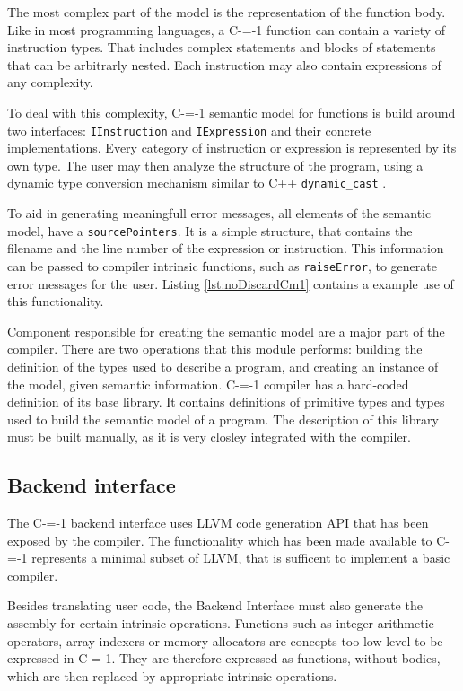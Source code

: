 The most complex part of the model is the representation of the function body.
Like in most programming languages, a C-=-1 function can contain a variety of instruction types.
That includes complex statements and blocks of statements that can be arbitrarly nested.
Each instruction may also contain expressions of any complexity.

To deal with this complexity, C-=-1 semantic model for functions is build around two interfaces: \lstinline{IInstruction} and \lstinline{IExpression} and their concrete implementations.
Every category of instruction or expression is represented by its own type.
The user may then analyze the structure of the program, using a dynamic type conversion mechanism similar to C++ \lstinline{dynamic_cast} \cite{ISO:cpp98}.

To aid in generating meaningfull error messages, all elements of the semantic model, have a \lstinline{sourcePointers}.
It is a simple structure, that contains the filename and the line number of the expression or instruction.
This information can be passed to compiler intrinsic functions, such as \lstinline{raiseError}, to generate error messages for the user.
Listing \ref{lst:noDiscardCm1} contains a example use of this functionality.

Component responsible for creating the semantic model are a major part of the compiler.
There are two operations that this module performs: building the definition of the types used to describe a program, and creating an instance of the model, given semantic information.
C-=-1 compiler has a hard-coded definition of its base library.
It contains definitions of primitive types and types used to build the semantic model of a program.
The description of this library must be built manually, as it is very closley integrated with the compiler.

\subsection{Backend interface}
\label{implementation/backend-interface}

The C-=-1 backend interface uses LLVM \cite{llvmir} code generation API that has been exposed by the compiler.
The functionality which has been made available to C-=-1 represents a minimal subset of LLVM, that is sufficent to implement a basic compiler.

Besides translating user code, the Backend Interface must also generate the assembly for certain intrinsic operations.
Functions such as integer arithmetic operators, array indexers or memory allocators are concepts too low-level to be expressed in C-=-1.
They are therefore expressed as functions, without bodies, which are then replaced by appropriate intrinsic operations.

